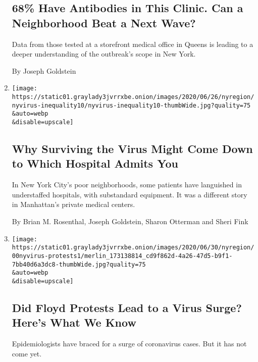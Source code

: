 \begin{enumerate}
{  \subsection{68\% Have Antibodies in This Clinic. Can a Neighborhood
  Beat a Next
  Wave?}\label{68-have-antibodies-in-this-clinic-can-a-neighborhood-beat-a-next-wave}}

  Data from those tested at a storefront medical office in Queens is
  leading to a deeper understanding of the outbreak's scope in New York.

  By Joseph Goldstein
\item
  \href{/2020/07/01/nyregion/Coronavirus-hospitals.html}{}

  \texttt{[image: https://static01.graylady3jvrrxbe.onion/images/2020/06/26/nyregion/nyvirus-inequality10/nyvirus-inequality10-thumbWide.jpg?quality=75\\\&auto=webp\\\&disable=upscale]}

  \hypertarget{why-surviving-the-virus-might-come-down-to-which-hospital-admits-you}{%
  \subsection{Why Surviving the Virus Might Come Down to Which Hospital
  Admits
  You}\label{why-surviving-the-virus-might-come-down-to-which-hospital-admits-you}}

  In New York City's poor neighborhoods, some patients have languished
  in understaffed hospitals, with substandard equipment. It was a
  different story in Manhattan's private medical centers.

  By Brian M. Rosenthal, Joseph Goldstein, Sharon Otterman and Sheri
  Fink
\item
  \href{/2020/07/01/nyregion/nyc-coronavirus-protests.html}{}

  \texttt{[image: https://static01.graylady3jvrrxbe.onion/images/2020/06/30/nyregion/00nyvirus-protests1/merlin\_173138814\_cd9f862d-4a26-47d5-b9f1-7bb40d6a3dc8-thumbWide.jpg?quality=75\\\&auto=webp\\\&disable=upscale]}

  \hypertarget{did-floyd-protests-lead-to-a-virus-surge-heres-what-we-know}{%
  \subsection{Did Floyd Protests Lead to a Virus Surge? Here's What We
  Know}\label{did-floyd-protests-lead-to-a-virus-surge-heres-what-we-know}}

  Epidemiologists have braced for a surge of coronavirus cases. But it
  has not come yet.


\end{enumerate}
